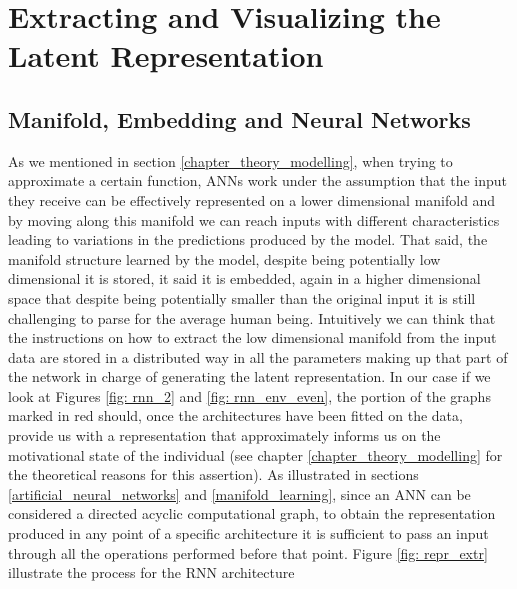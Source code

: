\section{Extracting and Visualizing the Latent Representation}
\label{extract_visulize}

\subsection{Manifold, Embedding and Neural Networks}
\label{manifold_learning_embedding_representation}
As we mentioned in section \ref{chapter_theory_modelling}, when trying to approximate a certain function, ANNs work under the assumption that the input they receive can be effectively represented on a lower dimensional manifold and by moving along this manifold we can reach inputs with different characteristics leading to variations in the predictions produced by the model. That said, the manifold structure learned by the model, despite being potentially low dimensional it is stored, it said it is embedded, again in a higher dimensional space \cite{bengio2017deep} that despite being potentially smaller than the original input it is still challenging to parse for the average human being. Intuitively we can think that the instructions on how to extract the low dimensional manifold from the input data are stored in a distributed way in all the parameters making up that part of the network in charge of generating the latent representation. In our case if we look at Figures \ref{fig: rnn_2} and \ref{fig: rnn_env_even}, the portion of the graphs marked in red should, once the architectures have been fitted on the data,  provide us with a representation that approximately informs us on the motivational state of the individual (see chapter \ref{chapter_theory_modelling} for the theoretical reasons for this assertion). As illustrated in sections \ref{artificial_neural_networks} and \ref{manifold_learning}, since an ANN can be considered a directed acyclic computational graph, to obtain the representation produced in any point of a specific architecture it is sufficient to pass an input through all the operations performed before that point. Figure \ref{fig: repr_extr} illustrate the process for the RNN architecture
